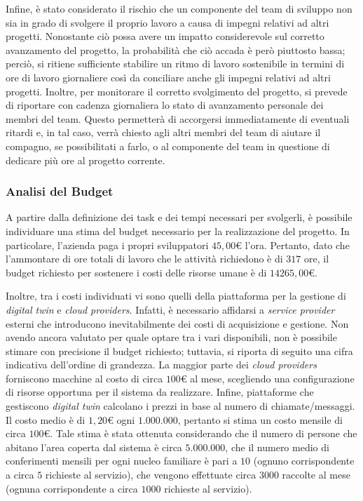 Infine, è stato considerato il rischio che un componente del team di sviluppo non sia in grado di svolgere il proprio lavoro a causa di impegni relativi ad altri progetti.
Nonostante ciò possa avere un impatto considerevole sul corretto avanzamento del progetto, la probabilità che ciò accada è però piuttosto bassa; perciò, si ritiene sufficiente stabilire un ritmo di lavoro sostenibile in termini di ore di lavoro giornaliere così da conciliare anche gli impegni relativi ad altri progetti.
Inoltre, per monitorare il corretto svolgimento del progetto, si prevede di riportare con cadenza giornaliera lo stato di avanzamento personale dei membri del team.
Questo permetterà di accorgersi immediatamente di eventuali ritardi e, in tal caso, verrà chiesto agli altri membri del team di aiutare il compagno, se possibilitati a farlo, o al componente del team in questione di dedicare più ore al progetto corrente.

\subsubsection{Analisi del Budget}
A partire dalla definizione dei task e dei tempi necessari per svolgerli, è possibile individuare una stima del budget necessario per la realizzazione del progetto.
In particolare, l'azienda paga i propri sviluppatori $45,00$\euro{} l'ora.
Pertanto, dato che l'ammontare di ore totali di lavoro che le attività richiedono è di $317$ ore, il budget richiesto per sostenere i costi delle risorse umane è di $14265,00$\euro{}.

Inoltre, tra i costi individuati vi sono quelli della piattaforma per la gestione di \textit{digital twin} e \textit{cloud providers}.
Infatti, è necessario affidarsi a \textit{service provider} esterni che introducono inevitabilmente dei costi di acquisizione e gestione.
Non avendo ancora valutato per quale optare tra i vari disponibili, non è possibile stimare con precisione il budget richiesto; tuttavia, si riporta di seguito una cifra indicativa dell'ordine di grandezza.
La maggior parte dei \textit{cloud providers} forniscono macchine al costo di circa $100$\euro{} al mese, scegliendo una configurazione di risorse opportuna per il sistema da realizzare.
Infine, piattaforme che gestiscono \textit{digital twin} calcolano i prezzi in base al numero di chiamate/messaggi.
Il costo medio è di $1,20$\euro{} ogni $1.000.000$, pertanto si stima un costo mensile di circa $100$\euro.
Tale stima è stata ottenuta considerando che il numero di persone che abitano l'area coperta dal sistema è circa $5.000.000$, che il numero medio di conferimenti mensili per ogni nucleo familiare è pari a $10$ (ognuno corrispondente a circa $5$ richieste al servizio), che vengono effettuate circa $3000$ raccolte al mese (ognuna corrispondente a circa $1000$ richieste al servizio).

